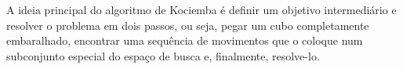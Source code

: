     A ideia principal do algoritmo de Kociemba é definir um objetivo intermediário e resolver o problema em dois passos, ou seja, pegar um cubo completamente embaralhado, encontrar uma sequência de movimentos que o coloque num subconjunto especial do espaço de busca e, finalmente, resolve-lo.\cite{robo4}


